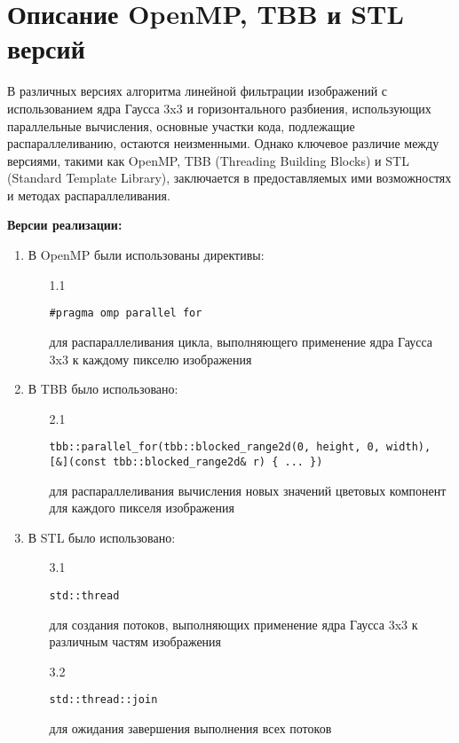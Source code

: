 \documentclass{report}
\begin{document}
\newpage

\section* {Описание OpenMP, TBB и STL версий}
\par В различных версиях алгоритма линейной фильтрации изображений с использованием ядра Гаусса 3x3 и горизонтального разбиения, использующих параллельные вычисления, основные участки кода, подлежащие распараллеливанию, остаются неизменными. Однако ключевое различие между версиями, такими как OpenMP, TBB (Threading Building Blocks) и STL (Standard Template Library), заключается в предоставляемых ими возможностях и методах распараллеливания.
\par \textbf{Версии реализации:}
\begin{enumerate}
\item В OpenMP были использованы директивы:
\vspace{0.5em}
\begin{enumerate}
\item[1.1] \begin{verbatim}
#pragma omp parallel for
\end{verbatim}

для распараллеливания цикла, выполняющего применение ядра Гаусса 3x3 к каждому пикселю изображения
\end{enumerate}
\item В TBB было использовано:
\vspace{0.5em}
\begin{enumerate}
\item[2.1] \begin{verbatim}
tbb::parallel_for(tbb::blocked_range2d(0, height, 0, width), [&](const tbb::blocked_range2d& r) { ... })
\end{verbatim}
для распараллеливания вычисления новых значений цветовых компонент для каждого пикселя изображения
\end{enumerate}
\item В STL было использовано:
\vspace{0.5em}
\begin{enumerate}
\item[3.1] \begin{verbatim}
std::thread
\end{verbatim}
для создания потоков, выполняющих применение ядра Гаусса 3x3 к различным частям изображения
\item[3.2] \begin{verbatim}
std::thread::join
\end{verbatim}
для ожидания завершения выполнения всех потоков
\end{enumerate}
\end{enumerate}
\end{document}
